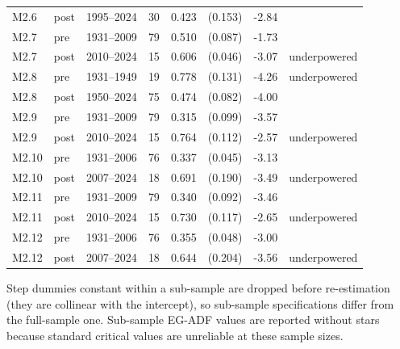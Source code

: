 \documentclass[11pt,a4paper]{article}
\begin{document}
\begin{longtable}{llrrrrrl}
M2.6 & post & 1995--2024 & 30 & 0.423 & (0.153) & -2.84 &  \\
M2.7 & pre & 1931--2009 & 79 & 0.510 & (0.087) & -1.73 &  \\
M2.7 & post & 2010--2024 & 15 & 0.606 & (0.046) & -3.07 & underpowered \\
M2.8 & pre & 1931--1949 & 19 & 0.778 & (0.131) & -4.26 & underpowered \\
M2.8 & post & 1950--2024 & 75 & 0.474 & (0.082) & -4.00 &  \\
M2.9 & pre & 1931--2009 & 79 & 0.315 & (0.099) & -3.57 &  \\
M2.9 & post & 2010--2024 & 15 & 0.764 & (0.112) & -2.57 & underpowered \\
M2.10 & pre & 1931--2006 & 76 & 0.337 & (0.045) & -3.13 &  \\
M2.10 & post & 2007--2024 & 18 & 0.691 & (0.190) & -3.49 & underpowered \\
M2.11 & pre & 1931--2009 & 79 & 0.340 & (0.092) & -3.46 &  \\
M2.11 & post & 2010--2024 & 15 & 0.730 & (0.117) & -2.65 & underpowered \\
M2.12 & pre & 1931--2006 & 76 & 0.355 & (0.048) & -3.00 &  \\
M2.12 & post & 2007--2024 & 18 & 0.644 & (0.204) & -3.56 & underpowered \\
\bottomrule
\end{longtable}
\noindent\footnotesize Step dummies constant within a sub-sample are dropped before re-estimation (they are collinear with the intercept), so sub-sample specifications differ from the full-sample one. Sub-sample EG-ADF values are reported without stars because standard critical values are unreliable at these sample sizes.\normalsize

\FloatBarrier
\end{document}
